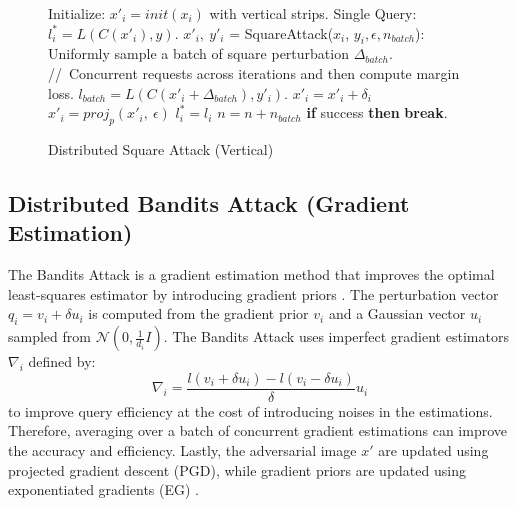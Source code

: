 \begin{figure}[H]
\begin{minipage}{\textwidth}
\begin{algorithm}[H]
    \centering
    \caption{Distributed Square Attack (Vertical)}
    \label{alg:square_vertical}
    \begin{algorithmic}[1]
            \State Initialize: $x'_{i} = init(x_{i})$ with vertical strips.
            \State Single Query: $l^{*}_i = L(C(x'_i), y)$.
            \State $x'_{i},\ y'_{i}$ = SquareAttack($x_{i}$, $y_{i},\epsilon, n_{batch}$):
            \Indent
                \For {each iteration $n \in [0,\ n_{iter})$}
                    \State Uniformly sample a batch of square perturbation $\Delta_{batch}$.
                    \State //\ Concurrent requests across iterations and then compute margin loss.
                    \State $l_{batch} = L(C(x'_i + \Delta_{batch}), y'_i)$.
                            \State $x'_i = x'_i + \delta_i$
                            \State $x'_i = proj_{p}(x'_i,\ \epsilon)$
                            \State $l^{*}_i = l_i$
                        \EndIf
                    \EndFor
                    \State $n = n + n_{batch}$
                    \State \textbf{if} {success} \textbf{then} {\textbf{break}}.
                \EndFor
            \EndIndent
        \EndFor
    \end{algorithmic}
\end{algorithm}
\end{minipage}
\end{figure}


\subsection{Distributed Bandits Attack (Gradient Estimation)}

The Bandits Attack is a gradient estimation method that improves the optimal least-squares estimator by introducing gradient priors \citep{ilyas2018prior}. The perturbation vector $q_i=v_i+\delta u_i$ is computed from the gradient prior $v_i$ and a Gaussian vector $u_i$ sampled from $\mathcal{N}(0, \frac{1}{d_i}I)$. The Bandits Attack uses imperfect gradient estimators $\nabla_i$ defined by: 
\begin{equation}
\nabla_i= \frac{l(v_i+\delta u_i)-l(v_i-\delta u_i)}{\delta} u_i
\end{equation}
to improve query efficiency at the cost of introducing noises in the estimations. Therefore, averaging over a batch of concurrent gradient estimations can improve the accuracy and efficiency. Lastly, the adversarial image $x'$ are updated using projected gradient descent (PGD), while gradient priors are updated using exponentiated gradients (EG) \citep{pmlr-v117-ghai20a}.

